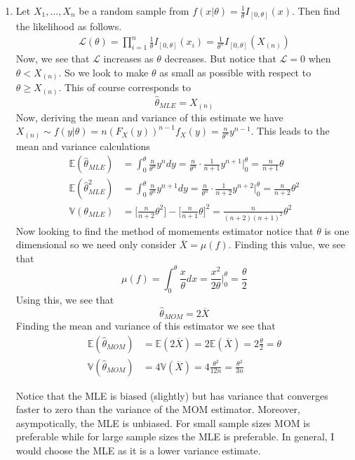 \documentclass[12pt]{article}  %
\newcommand{\E}{{\mathbb{E}}}
\begin{document}
\begin{enumerate}
\item Let $X_1, \ldots, X_n$ be a random sample from $f(x|\theta) = \frac{1}{\theta}I_{[0,\theta]}(x)$. Then find the likelihood as follows.
\begin{align*}
\mathcal{L}(\theta) = \prod_{i=1}^{n}\frac{1}{\theta}I_{[0,\theta]}(x_i) = \frac{1}{\theta^n}I_{[0,\theta]}(X_{(n)})
\end{align*}
Now, we see that $\mathcal{L}$ increases as $\theta$ decreases. But notice that $\mathcal{L} = 0$ when $\theta < X_{(n)}$. So we look to make $\theta$ as small as possible with respect to $\theta \geq X_{(n)}$. This of course corresponds to $$\hat{\theta}_{MLE} = X_{(n)}$$ 
Now, deriving the mean and variance of this estimate we have $X_{(n)}\sim f(y|\theta) = n(F_X(y))^{n-1}f_X(y) = \frac{n}{\theta^n}y^{n-1}$. This leads to the mean and variance calculations 
\begin{align*}
\E(\hat{\theta}_{MLE}) &= \int_{0}^{\theta}\frac{n}{\theta^n}y^{n}dy = \frac{n}{\theta^n}\cdot\frac{1}{n+1}y^{n+1}\Big\vert_{0}^{\theta} = \frac{n}{n+1}\theta\\
\E(\hat{\theta}_{MLE}^2) &= \int_{0}^{\theta}\frac{n}{\theta^n}y^{n+1}dy = \frac{n}{\theta^n}\cdot\frac{1}{n+2}y^{n+2}\Big\vert_{0}^{\theta} = \frac{n}{n+2}\theta^2\\
\mathbb{V}(\theta_{MLE}) &= \Big[\frac{n}{n+2}\theta^2\Big] - \Big[\frac{n}{n+1}\theta\Big]^2 = \frac{n}{(n+2)(n+1)^2}\theta^2
\end{align*}
Now looking to find the method of momements estimator notice that $\theta$ is one dimensional so we need only consider $\overline{X} = \mu(f)$. Finding this value, we see that $$\mu(f) = \int_{0}^{\theta}\frac{x}{\theta}dx = \frac{x^2}{2\theta}\Big\vert_{0}^{\theta} = \frac{\theta}{2}$$ Using this, we see that $$\hat{\theta}_{MOM} = 2\overline{X}$$
Finding the mean and variance of this estimator we see that 
\begin{align*}
\E(\hat{\theta}_{MOM}) &= \E(2\overline{X}) = 2\E(\overline{X}) = 2\frac{\theta}{2} = \theta\\
\mathbb{V}(\hat{\theta}_{MOM}) &= 4\mathbb{V}(\overline{X}) = 4\frac{\theta^2}{12n} = \frac{\theta^2}{3n} 
\end{align*}

Notice that the MLE is biased (slightly) but has variance that converges faster to zero than the variance of the MOM estimator. Moreover, asympotically, the MLE is unbiased. For small sample sizes MOM is preferable while for large sample sizes the MLE is preferable. In general, I would choose the MLE as it is a lower variance estimate. 


\end{enumerate}
\end{document}
